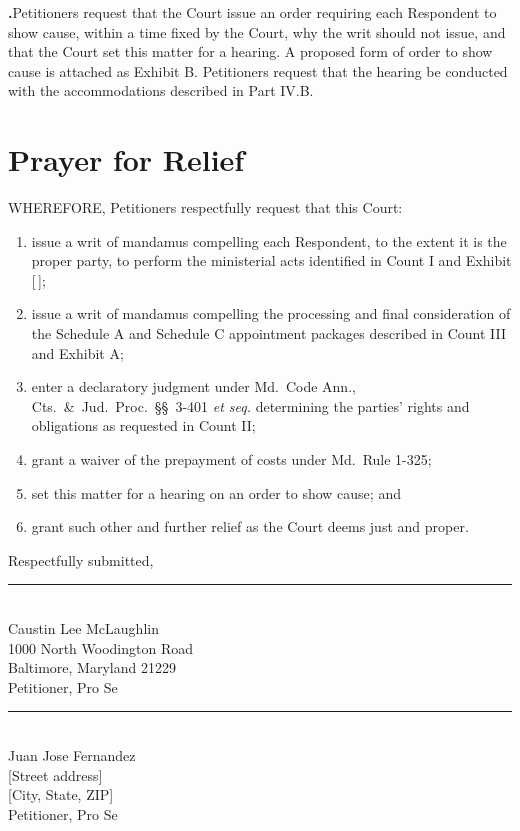 \documentclass[12pt,letterpaper]{article}
\newcounter{para}
\newcommand{\np}{%
  \par\medskip
  \refstepcounter{para}%
  \noindent\hangindent=0.45in\hangafter=1
  \textbf{\arabic{para}.}\hspace{0.15in}\ignorespaces}
\newcommand{\CJP}{Md.\ Code Ann., Cts.\ \&\ Jud.\ Proc.}
\newcommand{\R}{\S}
\begin{document}
\np Petitioners request that the Court issue an order requiring each Respondent
to show cause, within a time fixed by the Court, why the writ should not issue,
and that the Court set this matter for a hearing. A proposed form of order to
show cause is attached as Exhibit B. Petitioners request that the hearing be
conducted with the accommodations described in Part IV.B.

\section{Prayer for Relief}

WHEREFORE, Petitioners respectfully request that this Court:

\begin{enumerate}[label=(\alph*),leftmargin=0.6in,itemsep=3pt]
\item issue a writ of mandamus compelling each Respondent, to the extent it is
the proper party, to perform the ministerial acts identified in Count I and
Exhibit [\,];
\item issue a writ of mandamus compelling the processing and final
consideration of the Schedule A and Schedule C appointment packages described in
Count III and Exhibit A;
\item enter a declaratory judgment under \CJP\ \R\R\ 3-401 \textit{et seq.}
determining the parties' rights and obligations as requested in Count II;
\item grant a waiver of the prepayment of costs under Md.\ Rule 1-325;
\item set this matter for a hearing on an order to show cause; and
\item grant such other and further relief as the Court deems just and proper.
\end{enumerate}

\vspace{0.25in}
\noindent Respectfully submitted,

\vspace{0.35in}
\noindent\rule{2.8in}{0.4pt}\\
Caustin Lee McLaughlin\\
1000 North Woodington Road\\
Baltimore, Maryland 21229\\
Petitioner, Pro Se

\vspace{0.35in}
\noindent\rule{2.8in}{0.4pt}\\
Juan Jose Fernandez\\
{[Street address]}\\
{[City, State, ZIP]}\\
Petitioner, Pro Se
\end{document}
